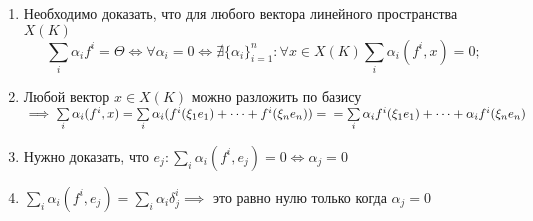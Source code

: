 \documentclass{article}
\author{Бугрий Илья M3134}
\date{November 2023}
\begin{document}
\begin{enumerate}
    \item Необходимо доказать, что для любого вектора линейного пространства $X(K)$
    $$
        \sum\limits_{i}{\alpha_i f^{i}} = \Theta \Longleftrightarrow \forall \alpha_i = 0 \Longleftrightarrow \nexists \{\alpha_i\}^{n}_{i = 1}: \forall x \in X(K) \sum\limits_{i}{\alpha_i (f^{i}, x)} = 0;
    $$
    \item Любой вектор $x \in X(K)$ можно разложить по базису $\implies \sum\limits_{i}{\alpha_i (f^{i}, x)} = \sum\limits_{i}{\alpha_i(f^{i}(\xi_1 e_1) + \dots + f^{i}(\xi_n e_n))} = \\
    = \sum\limits_{i}{\alpha_i f^{i}(\xi_1 e_1) + \dots + \alpha_i f^{i}(\xi_n e_n)}$ 
    \item Нужно доказать, что $e_j: \sum\limits_{i} \alpha_i (f^i, e_j) = 0 \Longleftrightarrow \alpha_j = 0$
    \item $\sum\limits_{i} \alpha_i (f^i, e_j) = \sum\limits_{i} \alpha_i \delta^{i}_{j} \implies$ это равно нулю только когда $\alpha_j = 0$
\end{enumerate}
\end{document}
